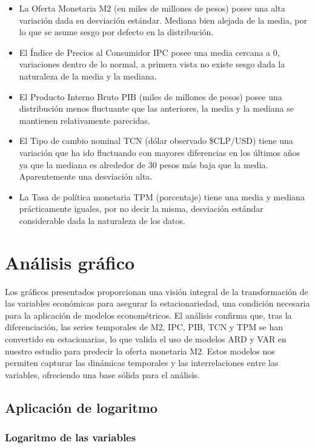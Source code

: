 \documentclass[
  12pt,
]{article}
\begin{document}
\begin{itemize}
\item
  La Oferta Monetaria M2 (en miles de millones de pesos) posee una alta
  variación dada su desviación estándar. Mediana bien alejada de la
  media, por lo que se asume sesgo por defecto en la distribución.
\item
  El Índice de Precios al Consumidor IPC posee una media cercana a 0,
  variaciones dentro de lo normal, a primera vista no existe sesgo dada
  la naturaleza de la media y la mediana.
\item
  El Producto Interno Bruto PIB (miles de millones de pesos) posee una
  distribución menos fluctuante que las anteriores, la media y la
  mediana se mantienen relativamente parecidas.
\item
  El Tipo de cambio nominal TCN (dólar observado \$CLP/USD) tiene una
  variación que ha ido fluctuando con mayores diferencias en los últimos
  años ya que la mediana es alrededor de 30 pesos más baja que la media.
  Aparentemente una desviación alta.
\item
  La Tasa de política monetaria TPM (porcentaje) tiene una media y
  mediana prácticamente iguales, por no decir la misma, desviación
  estándar considerable dada la naturaleza de los datos.
\end{itemize}

\section{Análisis gráfico}\label{anuxe1lisis-gruxe1fico}

Los gráficos presentados proporcionan una visión integral de la
transformación de las variables económicas para asegurar la
estacionariedad, una condición necesaria para la aplicación de modelos
econométricos. El análisis confirma que, tras la diferenciación, las
series temporales de M2, IPC, PIB, TCN y TPM se han convertido en
estacionarias, lo que valida el uso de modelos ARD y VAR en nuestro
estudio para predecir la oferta monetaria M2. Estos modelos nos permiten
capturar las dinámicas temporales y las interrelaciones entre las
variables, ofreciendo una base sólida para el análisis.

\subsection{Aplicación de logaritmo}\label{aplicaciuxf3n-de-logaritmo}

\subsubsection{Logaritmo de las
variables}\label{logaritmo-de-las-variables}
\end{document}
